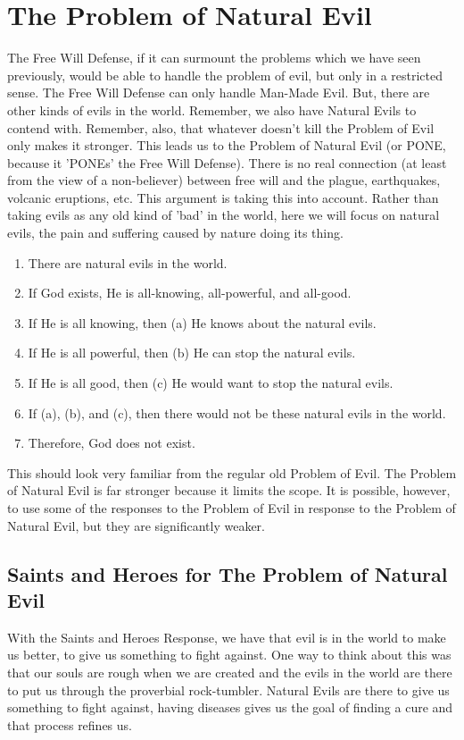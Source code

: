 \section{The Problem of Natural Evil}
The Free Will Defense, if it can surmount the problems which we have seen previously, would be able to handle the problem of evil, but only in a restricted sense. The Free Will Defense can only handle Man-Made Evil. But, there are other kinds of evils in the world. Remember, we also have Natural Evils to contend with. Remember, also, that whatever doesn't kill the Problem of Evil only makes it stronger. This leads us to the Problem of Natural Evil (or PONE, because it 'PONEs' the Free Will Defense). There is no real connection (at least from the view of a non-believer) between free will and the plague, earthquakes, volcanic eruptions, etc. This argument is taking this into account. Rather than taking evils as any old kind of 'bad' in the world, here we will focus on natural evils, the pain and suffering caused by nature doing its thing. 
\begin{enumerate}
    \item There are natural evils in the world.
    \item If God exists, He is all-knowing, all-powerful, and all-good.
    \item If He is all knowing, then (a) He knows about the natural evils.
    \item If He is all powerful, then (b) He can stop the natural evils.
    \item If He is all good, then (c) He would want to stop the natural evils.
    \item If (a), (b), and (c), then there would not be these natural evils in the world.
    \item Therefore, God does not exist.
\end{enumerate}
This should look very familiar from the regular old Problem of Evil. The Problem of Natural Evil is far stronger because it limits the scope. It is possible, however, to use some of the responses to the Problem of Evil in response to the Problem of Natural Evil, but they are significantly weaker. 

\subsection{Saints and Heroes for The Problem of Natural Evil}

With the Saints and Heroes Response, we have that evil is in the world to make us better, to give us something to fight against. One way to think about this was that our souls are rough when we are created and the evils in the world are there to put us through the proverbial rock-tumbler. Natural Evils are there to give us something to fight against, having diseases gives us the goal of finding a cure and that process refines us. 

